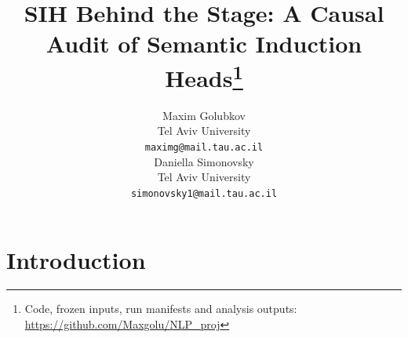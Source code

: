 \documentclass[11pt]{article}
\title{SIH Behind the Stage: A Causal Audit of Semantic Induction Heads\thanks{Code, frozen inputs, run manifests and analysis outputs: \url{https://github.com/Maxgolu/NLP_proj}}}
\author{Maxim Golubkov \\
  Tel Aviv University \\
  \texttt{maximg@mail.tau.ac.il} \\\And
  Daniella Simonovsky \\
  Tel Aviv University \\
  \texttt{simonovsky1@mail.tau.ac.il} \\}
\begin{document}
\maketitle

\begin{abstract}

\end{abstract}

\section{Introduction}
\label{sec:intro}
















\appendix









\end{document}

